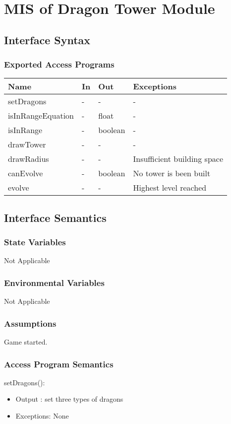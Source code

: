 \documentclass[12,english]{article}
\begin{document}
\section{MIS of Dragon Tower Module}
\subsection{Interface Syntax}
\subsubsection{Exported Access Programs}
\begin{table}[h!]
    \centering
    \begin{tabular}{|p{4cm}|p{2cm}|p{2cm}|p{2cm}|}
    \hline
    \textbf {Name}  & {In} & {Out} & {Exceptions} \\
    \hline
    setDragons & - & - & -\\
    \hline
    isInRangeEquation & - & float & -\\
    \hline
    isInRange & - & boolean & -\\
    \hline
    drawTower & - & - & -\\
    \hline
    drawRadius & - & - & Insufficient building space\\
    \hline
    canEvolve & - & boolean & No tower is been built\\
    \hline
    evolve & - & - & Highest level reached\\
    \hline
    \end{tabular}
\end{table}
\newpage

\subsection{Interface Semantics}
\subsubsection{State Variables}
Not Applicable
\subsubsection{Environmental Variables}
Not Applicable
\subsubsection{Assumptions}
Game started. 
\subsubsection{Access Program Semantics}
\noindent setDragons():
\begin{itemize}
    \item Output : set three types of dragons
    \item Exceptions: None
\end{itemize}
\end{document}
